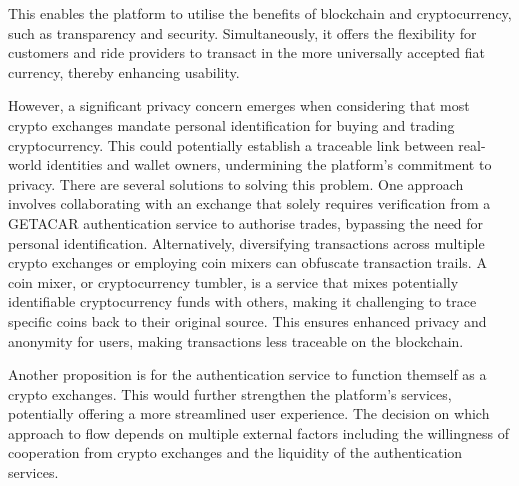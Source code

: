 This enables the platform to utilise the benefits of blockchain and cryptocurrency, such as transparency and security. Simultaneously, it offers the flexibility for customers and ride providers to transact in the more universally accepted fiat currency, thereby enhancing usability.

However, a significant privacy concern emerges when considering that most crypto exchanges mandate personal identification for buying and trading cryptocurrency. This could potentially establish a traceable link between real-world identities and wallet owners, undermining the platform's commitment to privacy. There are several solutions to solving this problem. One approach involves collaborating with an exchange that solely requires verification from a GETACAR authentication service to authorise trades, bypassing the need for personal identification. Alternatively, diversifying transactions across multiple crypto exchanges or employing coin mixers can obfuscate transaction trails. A coin mixer, or cryptocurrency tumbler, is a service that mixes potentially identifiable cryptocurrency funds with others, making it challenging to trace specific coins back to their original source. This ensures enhanced privacy and anonymity for users, making transactions less traceable on the blockchain.

Another proposition is for the authentication service to function themself as a crypto exchanges. This would further strengthen the platform's services, potentially offering a more streamlined user experience. The decision on which approach to flow  depends on multiple external factors including the willingness of cooperation from crypto exchanges and the liquidity of the authentication services.
 